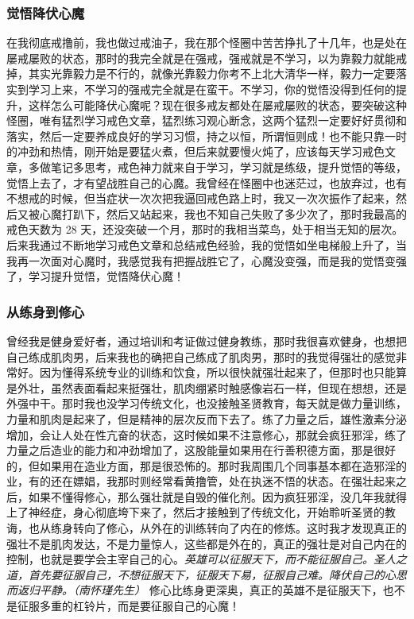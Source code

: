 \subsubsection{觉悟降伏心魔}

在我彻底戒撸前，我也做过戒油子，我在那个怪圈中苦苦挣扎了十几年，也是处在屡戒屡败的状态，那时的我完全就是在强戒，强戒就是不学习，以为靠毅力就能戒掉，其实光靠毅力是不行的，就像光靠毅力你考不上北大清华一样，毅力一定要落实到学习上来，不学习的强戒完全就是在蛮干。不学习，你的觉悟没得到任何的提升，这样怎么可能降伏心魔呢？现在很多戒友都处在屡戒屡败的状态，要突破这种怪圈，唯有猛烈学习戒色文章，猛烈练习观心断念，这两个猛烈一定要好好贯彻和落实，然后一定要养成良好的学习习惯，持之以恒，所谓恒则成！也不能只靠一时的冲劲和热情，刚开始是要猛火煮，但后来就要慢火炖了，应该每天学习戒色文章，多做笔记多思考，戒色神力就来自于学习，学习就是练级，提升觉悟的等级，觉悟上去了，才有望战胜自己的心魔。我曾经在怪圈中也迷茫过，也放弃过，也有不想戒的时候，但当症状一次次把我逼回戒色路上时，我又一次次振作了起来，然后又被心魔打趴下，然后又站起来，我也不知自己失败了多少次了，那时我最高的戒色天数为 28 天，还没突破一个月，那时的我相当菜鸟，处于相当无知的层次。后来我通过不断地学习戒色文章和总结戒色经验，我的觉悟如坐电梯般上升了，当我再一次面对心魔时，我感觉我有把握战胜它了，心魔没变强，而是我的觉悟变强了，学习提升觉悟，觉悟降伏心魔！

\subsubsection{从练身到修心}

曾经我是健身爱好者，通过培训和考证做过健身教练，那时我很喜欢健身，也想把自己练成肌肉男，后来我也的确把自己练成了肌肉男，那时的我觉得强壮的感觉非常好。因为懂得系统专业的训练和饮食，所以很快就强壮起来了，但那时也只能算是外壮，虽然表面看起来挺强壮，肌肉绷紧时触感像岩石一样，但现在想想，还是外强中干。那时我也没学习传统文化，也没接触圣贤教育，每天就是做力量训练，力量和肌肉是起来了，但是精神的层次反而下去了。练了力量之后，雄性激素分泌增加，会让人处在性亢奋的状态，这时候如果不注意修心，那就会疯狂邪淫，练了力量之后造业的能力和冲劲增加了，这股能量如果用在行善积德方面，那是很好的，但如果用在造业方面，那是很恐怖的。那时我周围几个同事基本都在造邪淫的业，有的还在嫖娼，我那时则经常看黄撸管，处在执迷不悟的状态。在强壮起来之后，如果不懂得修心，那么强壮就是自毁的催化剂。因为疯狂邪淫，没几年我就得上了神经症，身心彻底垮下来了，然后才接触到了传统文化，开始聆听圣贤的教诲，也从练身转向了修心，从外在的训练转向了内在的修炼。这时我才发现真正的强壮不是肌肉发达，不是力量惊人，这些都是外在的，真正的强壮是对自己内在的控制，也就是要学会主宰自己的心。\textit{英雄可以征服天下，而不能征服自己。圣人之道，首先要征服自己，不想征服天下，征服天下易，征服自己难。降伏自己的心思而返归平静。（南怀瑾先生）} 修心比练身更深奥，真正的英雄不是征服天下，也不是征服多重的杠铃片，而是要征服自己的心魔！

